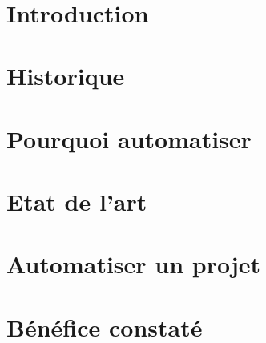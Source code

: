 \documentclass[11pt,a4paper]{article}
\begin{document}
	\pagestyle{plain} %
	 
\newpage
	~ %
\newpage
	\listoftodos 
\newpage
	\renewcommand{\contentsname}{Sommaire}
	\tableofcontents
\newpage
	\pagenumbering{\numerotationType} %
	\section*{Introduction}
	
\newpage
	\pagestyle{fancy}
	
	\renewcommand{\sectionmark}[1]{\markright{#1}}
	\renewcommand{\subsectionmark}[1]{\markright{#1}}
	\renewcommand{\subsubsectionmark}[1]{\markright{#1}}
	
	\lhead{\fancyplain{}{}}
	\chead{\fancyplain{}}
	\rhead{\fancyplain{}{\rightmark}}
	
	\lfoot{\fancyplain{}{}}	
	\cfoot{\fancyplain{}{}}	
	\rfoot{\fancyplain{}{\thepage}}

  \section{Historique}
	
\newpage
	\section{Pourquoi automatiser}
	
\newpage
	\section{Etat de l'art}
	
\newpage
	\section{Automatiser un projet}
	
\newpage
	\section{Bénéfice constaté}
	
\newpage
\end{document}
